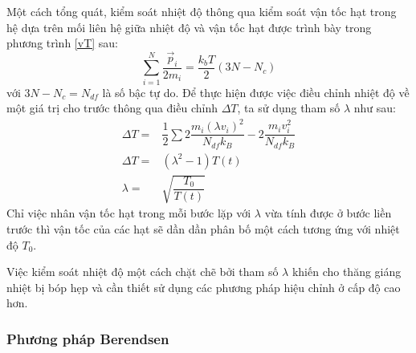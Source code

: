 \documentclass[12pt,a4paper,reqno, oneside]{book}
\begin{document}
		Một cách tổng quát, kiểm soát nhiệt độ thông qua kiểm soát vận tốc hạt trong hệ dựa trên mối liên hệ giữa nhiệt độ và vận tốc hạt được trình bày trong phương trình \eqref{vT} sau:
		\begin{equation}
		\sum_{i=1}^{N} \dfrac{\vec{p}_{i}}{2m_{i}} = \dfrac{k_{b}T}{2}\left(3N-N_{c}\right)
		\label{vT}
		\end{equation}
		với $3N - N_{c} = N_{df}$ là số bậc tự do.
		Để thực hiện được việc điều chỉnh nhiệt độ về một giá trị cho trước thông qua điều chỉnh $\Delta T$, ta sử dụng tham số $\lambda$ như sau:
		\begin{align}
		\Delta T = & \dfrac{1}{2} \sum 2\dfrac{m_{i}\left(\lambda v_{i}\right)^{2}}{N_{df} k_{B}} - 2\dfrac{m_{i} v_{i}^{2}}{N_{df} k_{B}}\\
		\Delta T = & \left(\lambda^{2} - 1\right) T\left(t\right)\\
		\lambda = &  \sqrt{\dfrac{T_{0}}{T\left(t\right)}}
		\end{align}
		Chỉ việc nhân vận tốc hạt trong mỗi bước lặp với $\lambda$ vừa tính được ở bước liền trước thì vận tốc của các hạt sẽ dần dần phân bố một cách tương ứng với nhiệt độ $T_{0}$.
		
		Việc kiểm soát nhiệt độ một cách chặt chẽ bởi tham số $\lambda$ khiến cho thăng giáng nhiệt bị bóp hẹp và cần thiết sử dụng các phương pháp hiệu chỉnh ở cấp độ cao hơn.
		\subsubsection{Phương pháp Berendsen}
		
\end{document}
